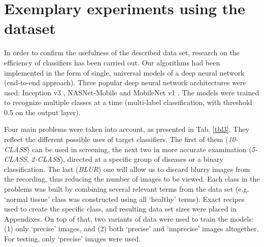 \documentclass[preprint]{article}
\renewcommand{\onecolumn}{}
\newcommand{\tabletextsize}{\tiny}
\begin{document}
\section{Exemplary experiments using the dataset}
\label{sec:experiments}

In order to confirm the usefulness of the described data set, research on the efficiency of classifiers has been carried out. Our algorithms had been implemented in the form of single, universal models of a deep neural network (end-to-end approach). Three popular deep neural network architectures were used: Inception v3 \cite{Szegedy_2016_CVPR},  NASNet-Mobile \cite{Zoph2017} and MobileNet v1 \cite{howard2017mobilenets}. The models were trained to recognize multiple classes at a time (multi-label classification, with threshold 0.5 on the output layer).

Four main problems were taken into account, as presented in Tab. \ref{tbl3}. They reflect the different possible uses of target classifiers. 
The first of them (\textit{10-CLASS}) can be used in screening, the next two in more accurate examination (\textit{5-CLASS}, \textit{2-CLASS}), directed at a specific group of diseases or a binary classification.
The last (\textit{BLUR}) one will allow us to discard blurry images from the recording,  thus reducing the number of images to be viewed.
Each class in the problems was built by combining several relevant terms from the data set (e.g. ‘normal tissue’ class was constructed using all ‘healthy’ terms). Exact recipes  used to create the specific class, and resulting data set sizes were placed in Appendixes. On top of that, two variants of data were used to train the models: (1) only ‘precise’ images, and (2) both ‘precise’ and ‘imprecise’ images altogether. For testing, only ‘precise’ images were used.


\onecolumn

\tabletextsize
\end{document}

